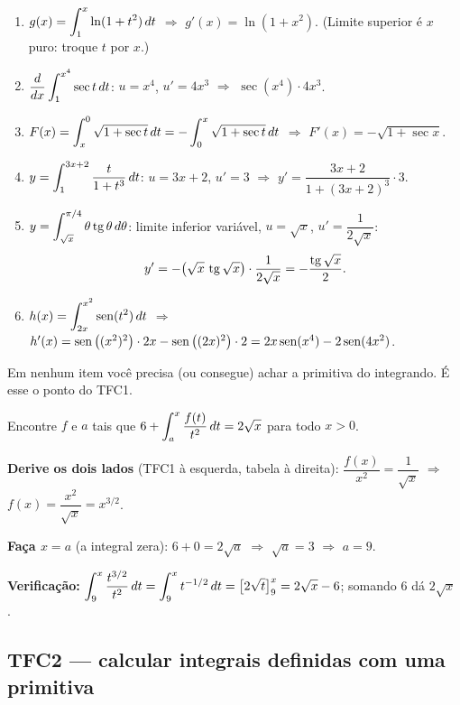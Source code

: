\begin{exemplo}
\begin{enumerate}[leftmargin=1.6em, itemsep=3pt, label=(\alph*)]
\item $g(x)=\displaystyle\int_1^x\ln(1+t^2)\,dt$ \;$\Rightarrow$\; $g'(x)=\ln(1+x^2)$. (Limite superior é $x$ puro: troque $t$ por $x$.)
\item $\dfrac{d}{dx}\displaystyle\int_1^{x^4}\sec t\,dt$: $u=x^4$, $u'=4x^3$ \;$\Rightarrow$\; $\sec(x^4)\cdot4x^3$.
\item $F(x)=\displaystyle\int_x^0\sqrt{1+\sec t}\,dt=-\int_0^x\sqrt{1+\sec t}\,dt$ \;$\Rightarrow$\; $F'(x)=-\sqrt{1+\sec x}$.
\item $y=\displaystyle\int_1^{3x+2}\frac{t}{1+t^3}\,dt$: $u=3x+2$, $u'=3$ \;$\Rightarrow$\; $y'=\dfrac{3x+2}{1+(3x+2)^3}\cdot3$.
\item $y=\displaystyle\int_{\sqrt x}^{\pi/4}\theta\operatorname{tg}\theta\,d\theta$: limite inferior variável, $u=\sqrt x$, $u'=\dfrac{1}{2\sqrt x}$:
\[
y'=-\big(\sqrt x\,\operatorname{tg}\sqrt x\big)\cdot\frac{1}{2\sqrt x}=-\frac{\operatorname{tg}\sqrt x}{2}.
\]
\item $h(x)=\displaystyle\int_{2x}^{x^2}\operatorname{sen}(t^2)\,dt$ \;$\Rightarrow$\; $h'(x)=\operatorname{sen}\big((x^2)^2\big)\cdot 2x-\operatorname{sen}\big((2x)^2\big)\cdot2=2x\operatorname{sen}(x^4)-2\operatorname{sen}(4x^2)$.
\end{enumerate}
Em nenhum item você precisa (ou consegue) achar a primitiva do integrando. É esse o ponto do TFC1.
\end{exemplo}

\begin{exemplo}
Encontre $f$ e $a$ tais que $\displaystyle 6+\int_a^x\frac{f(t)}{t^2}\,dt=2\sqrt x$ para todo $x>0$.

\textbf{Derive os dois lados} (TFC1 à esquerda, tabela à direita): $\dfrac{f(x)}{x^2}=\dfrac{1}{\sqrt x}$ \;$\Rightarrow$\; $f(x)=\dfrac{x^2}{\sqrt x}=x^{3/2}$.

\textbf{Faça $x=a$} (a integral zera): $6+0=2\sqrt a$ \;$\Rightarrow$\; $\sqrt a=3$ \;$\Rightarrow$\; $a=9$.

\textbf{Verificação:} $\displaystyle\int_9^x\frac{t^{3/2}}{t^2}\,dt=\int_9^x t^{-1/2}\,dt=\big[2\sqrt t\big]_9^x=2\sqrt x-6$; somando $6$ dá $2\sqrt x$ \ok.
\end{exemplo}

\subsection{TFC2 --- calcular integrais definidas com uma primitiva}


